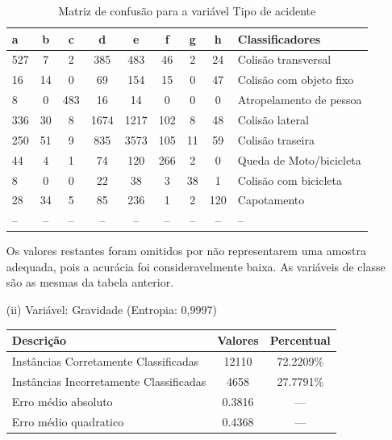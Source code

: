 \begin{enumerate}
		\begin{table}[!ht]
			\centering
			\caption{Matriz de confusão para a variável Tipo de acidente}
			\vspace{1mm}
			\begin{tabular}{l|c|c|c|c|c|c|c|l}
				\hline
				\textbf{a} & \textbf{b} & \textbf{c} & \textbf{d} & \textbf{e} & \textbf{f} & \textbf{g} & \textbf{h} & \textbf{Classificadores}\\
				\hline
				527 & 7 & 2 & 385 & 483 & 46 & 2 & 24 & Colisão transversal \\
				16 & 14 & 0 & 69 & 154 & 15 & 0 & 47 & Colisão com objeto fixo \\
				8 & 0 & 483 & 16 & 14 & 0 & 0 & 0 & Atropelamento de pessoa \\
				336 & 30 & 8 & 1674 & 1217 & 102 & 8 & 48 & Colisão lateral \\
				250 & 51 & 9 & 835 & 3573 & 105 & 11 & 59 & Colisão traseira \\
				44 & 4 & 1 & 74 & 120 & 266 & 2 & 0 & Queda de Moto/bicicleta \\
				8 & 0 & 0 & 22 & 38 & 3 & 38 & 1 & Colisão com bicicleta \\
				28 & 34 & 5 & 85 & 236 & 1 & 2 & 120 & Capotamento \\
				-- & -- & -- & -- & -- & -- & -- & -- & -- \\	
			\end{tabular}
		\end{table}
		
		Os valores restantes foram omitidos por não representarem uma amostra
		adequada, pois a acurácia foi consideravelmente baixa. As variáveis de classe são as mesmas da tabela
		anterior. \\
					
	\item[(ii)] Variável: Gravidade (Entropia: 0,9997)
	\begin{table}[!ht]
		\centering
		\vspace{1mm}
		\begin{tabular}{l|c|c}
			\hline
			\textbf{Descrição} & \textbf{Valores} & \textbf{Percentual} \\
			\hline
			Instâncias Corretamente Classificadas & 12110 & 72.2209\% \\
			Instâncias Incorretamente Classificadas & 4658 & 27.7791\% \\
			Erro médio absoluto & 0.3816 & ---  \\
			Erro médio quadratico & 0.4368 & --- \\
		\end{tabular}
	\end{table}
	

\end{enumerate}
